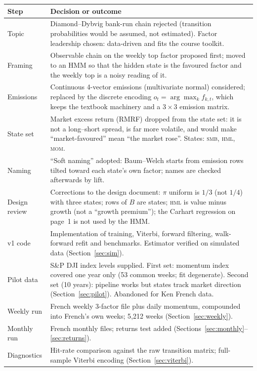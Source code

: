 \documentclass[11pt]{article}
\newcommand{\SMB}{\textsc{smb}}
\newcommand{\HML}{\textsc{hml}}
\newcommand{\MOM}{\textsc{mom}}
\begin{document}
\begin{longtable}{@{}p{2.2cm}p{12.8cm}@{}}
\toprule
Step & Decision or outcome \\
\midrule
\endhead
Topic & Diamond--Dybvig bank-run chain rejected (transition probabilities would be assumed, not estimated). Factor leadership chosen: data-driven and fits the course toolkit. \\
Framing & Observable chain on the weekly top factor proposed first; moved to an HMM so that the hidden state is the favoured factor and the weekly top is a noisy reading of it. \\
Emissions & Continuous 4-vector emissions (multivariate normal) considered; replaced by the discrete encoding $o_t=\arg\max_k f_{k,t}$, which keeps the textbook machinery \citep[App.~A]{jurafsky_slp3} and a $3\times3$ emission matrix. \\
State set & Market excess return (RMRF) dropped from the state set: it is not a long--short spread, is far more volatile, and would make ``market-favoured'' mean ``the market rose''. States: \SMB, \HML, \MOM. \\
Naming & ``Soft naming'' adopted: Baum--Welch starts from emission rows tilted toward each state's own factor; names are checked afterwards by lift. \\
Design review & Corrections to the design document: $\pi$ uniform is $1/3$ (not $1/4$) with three states; rows of $B$ are states; \HML{} is value minus growth (not a ``growth premium''); the Carhart regression on page~1 is not used by the HMM. \\
v1 code & Implementation of training, Viterbi, forward filtering, walk-forward refit and benchmarks. Estimator verified on simulated data (Section~\ref{sec:sim}). \\
Pilot data & S\&P DJI index levels supplied. First set: momentum index covered one year only (53 common weeks; fit degenerate). Second set (10 years): pipeline works but states track market direction (Section~\ref{sec:pilot}). Abandoned for Ken French data. \\
Weekly run & French weekly 3-factor file plus daily momentum, compounded into French's own weeks; 5{,}212 weeks (Section~\ref{sec:weekly}). \\
Monthly run & French monthly files; returns test added (Sections~\ref{sec:monthly}--\ref{sec:returns}). \\
Diagnostics & Hit-rate comparison against the raw transition matrix; full-sample Viterbi encoding (Section~\ref{sec:viterbi}). \\

\end{longtable}
\end{document}

